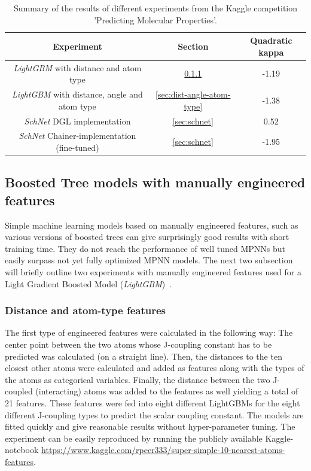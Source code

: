 \begin{table}[H]
	\begin{tabular}{||c c c||} 
		\hline
		Experiment & Section & Quadratic kappa \\ [0.5ex] 
		\hline\hline
		\textit{LightGBM} with distance and atom type & \ref{sec:dist-atom-type} & -1.19 \\ 
		\textit{LightGBM} with distance, angle and atom type & \ref{sec:dist-angle-atom-type} & -1.38 \\
		\textit{SchNet} DGL implementation & \ref{sec:schnet} & 0.52  \\
		\textit{SchNet} Chainer-implementation (fine-tuned) & \ref{sec:schnet} & -1.95 \\ [1ex] 
		\hline
	\end{tabular}
	\vspace{0.5cm}
	\caption{Summary of the results of different experiments from the Kaggle competition 'Predicting Molecular Properties'.}
	\label{tab:champs-results}
\end{table}


\subsection{Boosted Tree models with manually engineered features}
\label{sec:champs-boosted-tree}

Simple machine learning models based on manually engineered features, such as various versions of boosted trees can give surprisingly good results with short training time. They do not reach the performance of well tuned MPNNs but easily surpass not yet fully optimized MPNN models. The next two subsection will briefly outline two experiments with manually engineered features used for a Light Gradient Boosted Model (\textit{LightGBM})~\cite{Ke2017}.


\subsubsection{Distance and atom-type features}
\label{sec:dist-atom-type}

The first type of engineered features were calculated in the following way: The center point between the two atoms whose J-coupling constant has to be predicted was calculated (on a straight line). Then, the distances to the ten closest other atoms were calculated and added as features along with the types of the atoms as categorical variables. Finally, the distance between the two J-coupled (interacting) atoms was added to the features as well yielding a total of 21 features. These features were fed into eight different LightGBMs
for the eight different J-coupling types to predict the scalar coupling constant. The models are fitted quickly and give reasonable results without hyper-parameter tuning. The experiment can be easily reproduced by running the publicly available Kaggle-notebook \url{https://www.kaggle.com/rpeer333/super-simple-10-nearest-atoms-features}.

